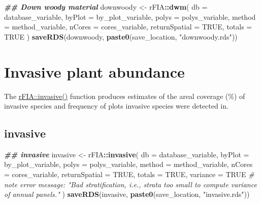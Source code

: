\documentclass[
]{book}
\newenvironment{Shaded}{\begin{snugshade}}{\end{snugshade}}
\newcommand{\AttributeTok}[1]{\textcolor[rgb]{0.13,0.29,0.53}{#1}}
\newcommand{\CommentTok}[1]{\textcolor[rgb]{0.56,0.35,0.01}{\textit{#1}}}
\newcommand{\ConstantTok}[1]{\textcolor[rgb]{0.56,0.35,0.01}{#1}}
\newcommand{\DocumentationTok}[1]{\textcolor[rgb]{0.56,0.35,0.01}{\textbf{\textit{#1}}}}
\newcommand{\FunctionTok}[1]{\textcolor[rgb]{0.13,0.29,0.53}{\textbf{#1}}}
\newcommand{\NormalTok}[1]{#1}
\newcommand{\OtherTok}[1]{\textcolor[rgb]{0.56,0.35,0.01}{#1}}
\newcommand{\SpecialCharTok}[1]{\textcolor[rgb]{0.81,0.36,0.00}{\textbf{#1}}}
\newcommand{\StringTok}[1]{\textcolor[rgb]{0.31,0.60,0.02}{#1}}
\begin{document}
\begin{Shaded}
\begin{Highlighting}[]
\DocumentationTok{\#\# Down woody material }
\NormalTok{downwoody }\OtherTok{\textless{}{-}}\NormalTok{ rFIA}\SpecialCharTok{::}\FunctionTok{dwm}\NormalTok{(}
  \AttributeTok{db =}\NormalTok{ database\_variable,}
  \AttributeTok{byPlot =}\NormalTok{ by\_plot\_variable,}
  \AttributeTok{polys =}\NormalTok{ polys\_variable,}
  \AttributeTok{method =}\NormalTok{ method\_variable,}
  \AttributeTok{nCores =}\NormalTok{ cores\_variable,}
  \AttributeTok{returnSpatial =} \ConstantTok{TRUE}\NormalTok{,}
  \AttributeTok{totals =} \ConstantTok{TRUE}
\NormalTok{)}
\FunctionTok{saveRDS}\NormalTok{(downwoody, }\FunctionTok{paste0}\NormalTok{(save\_location, }\StringTok{"downwoody.rds"}\NormalTok{))}
\end{Highlighting}
\end{Shaded}

\hypertarget{invasive-plant-abundance}{%
\section{Invasive plant abundance}\label{invasive-plant-abundance}}

The \href{https://rdrr.io/cran/rFIA/man/invasive.html}{rFIA::invasive()} function produces estimates of the areal coverage (\%) of invasive species and frequency of plots invasive species were detected in.

\hypertarget{invasive}{%
\subsection{invasive}\label{invasive}}

\begin{Shaded}
\begin{Highlighting}[]
\DocumentationTok{\#\# invasive}
\NormalTok{invasive }\OtherTok{\textless{}{-}}\NormalTok{ rFIA}\SpecialCharTok{::}\FunctionTok{invasive}\NormalTok{(}
  \AttributeTok{db =}\NormalTok{ database\_variable,}
  \AttributeTok{byPlot =}\NormalTok{ by\_plot\_variable,}
  \AttributeTok{polys =}\NormalTok{ polys\_variable,}
  \AttributeTok{method =}\NormalTok{ method\_variable,}
  \AttributeTok{nCores =}\NormalTok{ cores\_variable,}
  \AttributeTok{returnSpatial =} \ConstantTok{TRUE}\NormalTok{,}
  \AttributeTok{totals =} \ConstantTok{TRUE}\NormalTok{,}
  \AttributeTok{variance =} \ConstantTok{TRUE} \CommentTok{\# note error message: "Bad stratification, i.e., strata too small to compute variance of annual panels." }
\NormalTok{)}
\FunctionTok{saveRDS}\NormalTok{(invasive, }\FunctionTok{paste0}\NormalTok{(save\_location, }\StringTok{"invasive.rds"}\NormalTok{))}
\end{Highlighting}
\end{Shaded}
\end{document}
